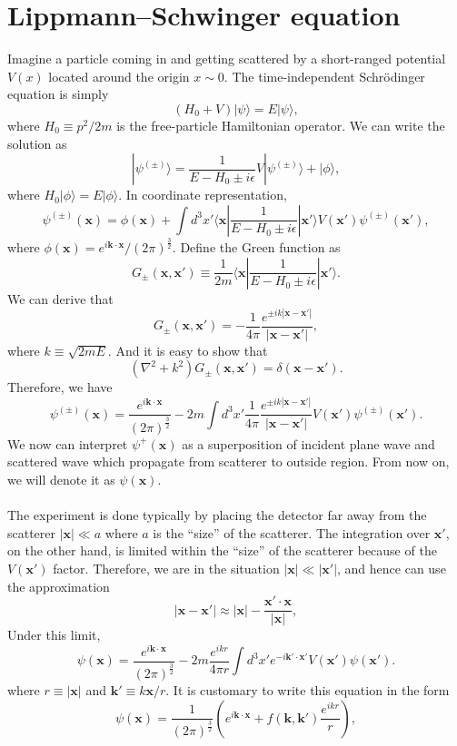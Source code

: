 \section{Lippmann–Schwinger equation}
Imagine a particle coming in and getting scattered by a short-ranged potential $V(x)$ located around the origin $x \sim 0$. The time-independent Schr\"{o}dinger equation is simply
\[(H_0 + V)|\psi\rangle = E |\psi\rangle,\]
where $H_0 \equiv {p^2}/{2m}$ is the free-particle Hamiltonian operator. We can write the solution as
\[|\psi^{(\pm)}\rangle = \frac{1}{E-H_0 \pm i\epsilon}V|\psi^{(\pm)}\rangle + |\phi\rangle,\]
where $H_0 |\phi\rangle = E |\phi\rangle$. In coordinate representation,
\[\psi^{(\pm)}(\mathbf{x}) = \phi(\mathbf{x}) + \int d^3x' \langle \bm{x} | \frac{1}{E-H_0 \pm i\epsilon} | \bm{x}' \rangle V(\bm{x}') \psi^{(\pm)}(\bm{x}'),\]
where $\phi(\bm{x}) = e^{i\bm{k}\cdot\bm{x}} / (2\pi)^{\frac{3}{2}}$. Define the Green function as
\[G_{\pm}(\bm{x},\bm{x}') \equiv \frac{1}{2m} \langle \bm{x} | \frac{1}{E-H_0 \pm i\epsilon} | \bm{x}' \rangle.\]
We can derive that
\[G_{\pm}(\bm{x},\bm{x}') = -\frac{1}{4\pi} \frac{e^{\pm ik|\bm{x}-\bm{x}'|}}{|\bm{x}-\bm{x}'|},\]
where $k \equiv \sqrt{2mE}$. And it is easy to show that
\[(\nabla^2 + k^2)G_{\pm}(\bm{x},\bm{x}') = \delta(\bm{x}-\bm{x}').\]
Therefore, we have
\[\psi^{(\pm)}(\bm{x}) = \frac{e^{i\bm{k}\cdot\bm{x}}}{(2\pi)^{\frac{3}{2}}} - 2m \int d^3x' \frac{1}{4\pi} \frac{e^{\pm ik|\bm{x}-\bm{x}'|}}{|\bm{x}-\bm{x}'|} V(\bm{x}') \psi^{(\pm)}(\bm{x}').\]
We now can interpret $\psi^{+}(\bm{x})$ as a superposition of incident plane wave and scattered wave which propagate from scatterer to outside region. From now on, we will denote it as $\psi(\bm{x})$.
\\ \\
The experiment is done typically by placing the detector far away from the scatterer $|\bm{x}| \ll a$ where $a$ is the ``size'' of the scatterer. The integration over $\bm{x}'$, on the other hand, is limited within the ``size'' of the scatterer because of the $V(\bm{x}')$ factor. Therefore, we are in the situation $|\bm{x}| \ll |\bm{x}'|$, and hence can use the approximation
\[|\bm{x}-\bm{x}'| \approx |\bm{x}| - \frac{\bm{x}' \cdot \bm{x}}{|\bm{x}|},\]
Under this limit,
\[\psi(\bm{x}) = \frac{e^{i\bm{k}\cdot\bm{x}}}{(2\pi)^{\frac{3}{2}}} - 2m \frac{e^{ikr}}{4\pi r} \int d^3x' e^{-i\bm{k}' \cdot \bm{x}'} V(\bm{x}') \psi(\bm{x}').\]
where $r \equiv |\bm{x}|$ and $\bm{k}' \equiv k {\bm{x}}/{r}$. It is customary to write this equation in the form
\[\psi(\bm{x}) = \frac{1}{(2\pi)^{\frac{3}{2}}}\left( e^{i\bm{k}\cdot\bm{x}} +  f(\bm{k},\bm{k}') \frac{e^{ikr}}{r} \right) ,\]
